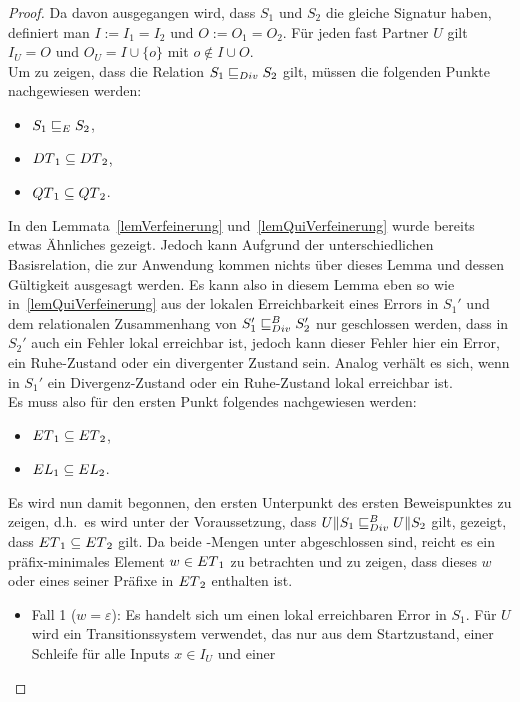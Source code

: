 \begin{proof}
  Da davon ausgegangen wird, dass $S_1$ und $S_2$ die gleiche Signatur haben,
  definiert man $I:=I_1=I_2$ und $O:=O_1=O_2$. Für jeden fast Partner $U$ gilt
  $I_U=O$ und $O_U=I\cup\{o\}$ mit $o\notin I\cup O$.\\
  Um zu zeigen, dass die Relation $S_1\sqsubseteq _{Div} S_2$ gilt, müssen die folgenden
  Punkte nachgewiesen werden:
  \begin{itemize}
    \item $S_1\sqsubseteq _E S_2$,
    \item $DT{}_1\subseteq DT{}_2$,
    \item $QT{}_1\subseteq QT{}_2$.
  \end{itemize}
  In den Lemmata~\ref{lemVerfeinerung} und~\ref{lemQuiVerfeinerung} wurde
  bereits etwas Ähnliches gezeigt. Jedoch kann Aufgrund der unterschiedlichen
  Basisrelation, die zur Anwendung kommen nichts über dieses Lemma und dessen
  Gültigkeit ausgesagt werden. Es kann also in diesem Lemma eben so wie
  in~\ref{lemQuiVerfeinerung} aus der lokalen Erreichbarkeit eines Errors in
  $S_1'$ und dem relationalen Zusammenhang von $S_1'\sqsubseteq _{Div}^B S_2'$ nur
  geschlossen werden, dass in $S_2'$ auch ein Fehler lokal erreichbar ist,
  jedoch kann dieser Fehler hier ein Error, ein Ruhe-Zustand oder ein
  divergenter Zustand sein. Analog verhält es sich, wenn in $S_1'$ ein
  Divergenz-Zustand oder ein Ruhe-Zustand lokal erreichbar ist.\\
  Es muss also für den ersten Punkt folgendes nachgewiesen werden:
  \begin{itemize}
    \item $ET{}_1\subseteq ET{}_2$,
    \item $EL{}_1\subseteq EL{}_2$.
  \end{itemize}
  Es wird nun damit begonnen, den ersten Unterpunkt des ersten Beweispunktes zu
  zeigen, d.h.\ es wird unter der Voraussetzung, dass $U\|S_1\sqsubseteq _{Div}^B U\|S_2$
  gilt, gezeigt, dass $ET{}_1\subseteq ET{}_2$ gilt. Da beide \ET{}-Mengen
  unter \cont{} abgeschlossen sind, reicht es ein präfix-minimales Element
  $w\in ET{}_1$ zu betrachten und zu zeigen, dass dieses $w$ oder eines seiner
  Präfixe in $ET{}_2$ enthalten ist.
  \begin{itemize}
    \item Fall 1 ($w=\varepsilon$): Es handelt sich um einen lokal erreichbaren
      Error in $S_1$. Für $U$ wird ein Transitionssystem verwendet, das nur aus
      dem Startzustand, einer Schleife für alle Inputs $x\in I_U$ und einer

\end{itemize}
\end{proof}
